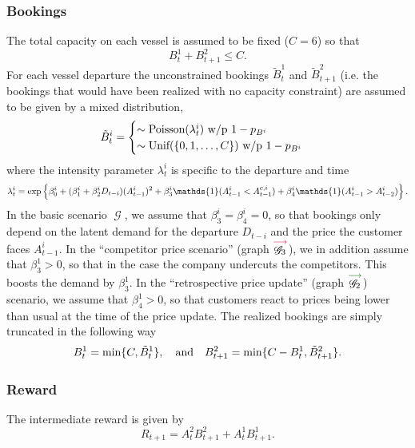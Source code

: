 \documentclass[12pt,a4paper]{article}
\theoremstyle{definition}
\DeclareMathOperator{\gG}{\mathscr{G}}
\begin{document}
\subsubsection*{Bookings}
The total capacity on each vessel is assumed to be fixed ($C=6$) so that
\[
    B_{t}^1 + B_{t+1}^2 \leq C.
\]
For each vessel departure the unconstrained bookings $\tilde{B}_{t}^1$ and $\tilde{B}^2_{t+1}$ (i.e. the bookings that would have been realized with no capacity constraint) are assumed to be given by a mixed distribution,
\[
    \tilde{B}_{t}^i  =
    \begin{cases}
        \sim \textup{Poisson}(\lambda^i_{t}) ~ \textup{w/p $1 - p_{B^i}$} \\
        \sim \textup{Unif}(\{0, 1, \dots, C\}) ~ \textup{w/p $1 - p_{B^i}$}
    \end{cases}
\]
where the intensity parameter $\lambda^i_{t}$ is specific to the departure and time
\[
    \lambda^i_{t} = \textup{exp}\left\{\beta^i_0 + (\beta^i_1 + \beta^i_2 D_{t-i}) (A^i_{t-1})^2 + \beta^i_3 \mathds{1}(A^i_{t-1} < A^{c, i}_{t-1}) + \beta^i_4 \mathds{1}(A^i_{t-1} > A^i_{t-2})\right\}.
\]
In the basic scenario $\gG$, we assume that $\beta^i_3 = \beta^i_4 = 0$, so that bookings only depend on the latent demand for the departure $D_{t-i}$ and the price the customer faces $A^i_{t-1}$. In the ``competitor price scenario'' (graph $\overset{\textcolor{graphRed}{\longrightarrow}}{\gG_3}$), we in addition assume that $\beta^1_{3} > 0$, so that in the case the company undercuts the competitors. This boosts the demand by $\beta^1_{3}$. In the ``retrospective price update'' (graph $\overset{\textcolor{graphGreen}{\longrightarrow}}{\gG_2}$) scenario, we assume that $\beta^1_4 > 0$, so that customers react to prices being lower than usual at the time of the price update. The realized bookings are simply truncated in the following way
\[
    B_{t}^1 = \textup{min}\{C, \tilde{B}_{t}^1\}, \quad \textup{and} \quad B_{t+1}^2 = \textup{min}\{C - B_{t}^{1}, \tilde{B}_{t+1}^2\}.
\]

\subsubsection*{Reward}
The intermediate reward is given by
\[
  R_{t+1} = A^2_t B^2_{t+1} + A^1_t B^1_{t+1}.
\]
\end{document}
